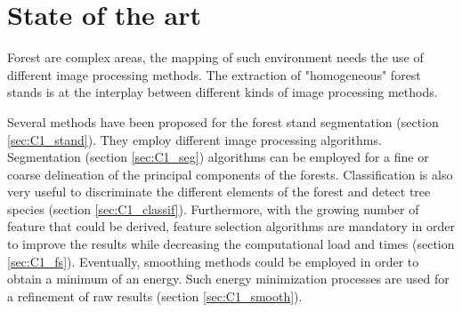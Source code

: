 \chapter{State of the art} %
\label{Chapter1} %

\startcontents[chapters]
\Mprintcontents





Forest are complex areas, the mapping of such environment needs the use of different image processing methods. The extraction of "homogeneous" forest stands is at the interplay between different kinds of image processing methods.

Several methods have been proposed for the forest stand segmentation (section \ref{sec:C1_stand}). They employ different image processing algorithms. Segmentation (section \ref{sec:C1_seg}) algorithms can be employed for a fine or coarse delineation of the principal components of the forests. Classification is also very useful to discriminate the different elements of the forest and detect tree species (section \ref{sec:C1_classif}). Furthermore, with the growing number of feature that could be derived, feature selection algorithms are mandatory in order to improve the results while decreasing the computational load and times (section \ref{sec:C1_fs}). Eventually, smoothing methods could be employed in order to obtain a minimum of an energy. Such energy minimization processes are used for a refinement of raw results (section \ref{sec:C1_smooth}).

\newpage
{} 
\newpage

